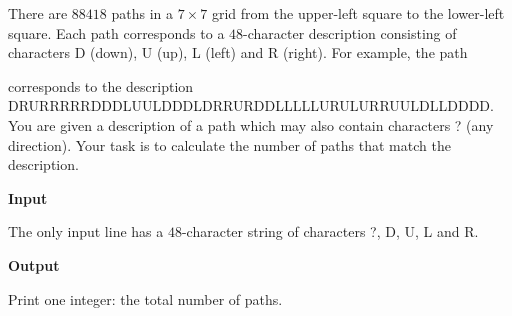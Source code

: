 There are $88418$ paths in a $7 \times 7$ grid from the upper-left square to the lower-left square. Each path corresponds to a $48$-character description consisting of characters D (down), U (up), L (left) and R (right).
For example, the path

corresponds to the description DRURRRRRDDDLUULDDDLDRRURDDLLLLLURULURRUULDLLDDDD.
You are given a description of a path which may also contain characters ? (any direction). Your task is to calculate the number of paths that match the description.

\vspace{0.3cm}\noindent\textbf{Input}

The only input line has a $48$-character string of characters ?, D, U, L and R.

\vspace{0.3cm}\noindent\textbf{Output}

Print one integer: the total number of paths.